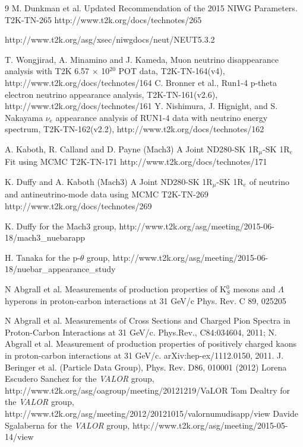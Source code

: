 \begin{thebibliography}{9}
   M. Dunkman et al.
   Updated Recommendation of the 2015 NIWG Parameters.
   T2K-TN-265
   http://www.t2k.org/docs/technotes/265
   
   http://www.t2k.org/asg/xsec/niwgdocs/neut/NEUT5.3.2
   
%
%
%


  T. Wongjirad, A. Minamino and J. Kameda,
  Muon neutrino disappearance analysis with T2K 6.57 $\times$ 10$^{20}$ POT data,
  T2K-TN-164(v4),
  http://www.t2k.org/docs/technotes/164
  C. Bronner et al.,
  Run1-4 p-theta electron neutrino appearance analysis,
  T2K-TN-161(v2.6),
  http://www.t2k.org/docs/technotes/161
  Y. Nishimura, J. Hignight, and S. Nakayama
  $\nu_e$ appearance analysis of RUN1-4 data with neutrino energy spectrum,
  T2K-TN-162(v2.2),
  http://www.t2k.org/docs/technotes/162
  
  A. Kaboth, R. Calland and D. Payne (Mach3)
  A Joint ND280-SK 1$\text{R}_{\mu}$-SK 1$\text{R}_e$ Fit using MCMC 
  T2K-TN-171
  http://www.t2k.org/docs/technotes/171

  K. Duffy and A. Kaboth (Mach3)
  A Joint ND280-SK 1$\text{R}_{\mu}$-SK 1$\text{R}_e$ of neutrino and antineutrino-mode data using MCMC  
  T2K-TN-269
  http://www.t2k.org/docs/technotes/269

K. Duffy for the Mach3 group,
http://www.t2k.org/asg/meeting/2015-06-18/mach3\_nuebarapp

H. Tanaka for the p-$\theta$ group,
http://www.t2k.org/asg/meeting/2015-06-18/nuebar\_appearance\_study

%
%

  N Abgrall et al. Measurements of production properties of K$^{0}_{S}$ mesons and $\Lambda$ hyperons in proton-carbon interactions at 31 GeV/c
  Phys. Rev. C 89, 025205

  N Abgrall et al. Measurements of Cross Sections and Charged Pion Spectra in Proton-Carbon Interactions
  at 31 GeV/c. Phys.Rev., C84:034604, 2011;
  N. Abgrall et al. Measurement of production properties of positively charged kaons in proton-carbon
  interactions at 31 GeV/c. arXiv:hep-ex/1112.0150, 2011.
%
%
  J. Beringer et al. (Particle Data Group), Phys. Rev. D86, 010001 (2012)
%
%
  Lorena Escudero Sanchez for the {\em VALOR} group, 
  http://www.t2k.org/asg/oagroup/meeting/20121219/VaLOR%
  Tom Dealtry for the {\em VALOR} group,
  http://www.t2k.org/asg/meeting/2012/20121015/valornumudisapp/view
  Davide Sgalaberna for the {\em VALOR} group,
  http://www.t2k.org/asg/meeting/2015-05-14/view


\end{thebibliography}

